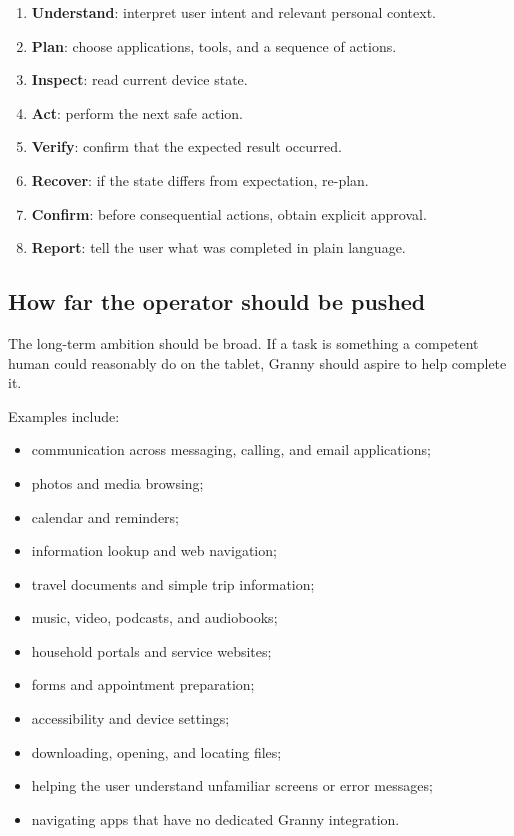 \documentclass[11pt]{article}
\begin{document}
\begin{enumerate}[leftmargin=*]
    \item \textbf{Understand}: interpret user intent and relevant personal context.
    \item \textbf{Plan}: choose applications, tools, and a sequence of actions.
    \item \textbf{Inspect}: read current device state.
    \item \textbf{Act}: perform the next safe action.
    \item \textbf{Verify}: confirm that the expected result occurred.
    \item \textbf{Recover}: if the state differs from expectation, re-plan.
    \item \textbf{Confirm}: before consequential actions, obtain explicit approval.
    \item \textbf{Report}: tell the user what was completed in plain language.
\end{enumerate}

\subsection{How far the operator should be pushed}
The long-term ambition should be broad. If a task is something a competent human could reasonably do on the tablet, Granny should aspire to help complete it.

Examples include:

\begin{itemize}[leftmargin=*]
    \item communication across messaging, calling, and email applications;
    \item photos and media browsing;
    \item calendar and reminders;
    \item information lookup and web navigation;
    \item travel documents and simple trip information;
    \item music, video, podcasts, and audiobooks;
    \item household portals and service websites;
    \item forms and appointment preparation;
    \item accessibility and device settings;
    \item downloading, opening, and locating files;
    \item helping the user understand unfamiliar screens or error messages;
    \item navigating apps that have no dedicated Granny integration.
\end{itemize}
\end{document}
